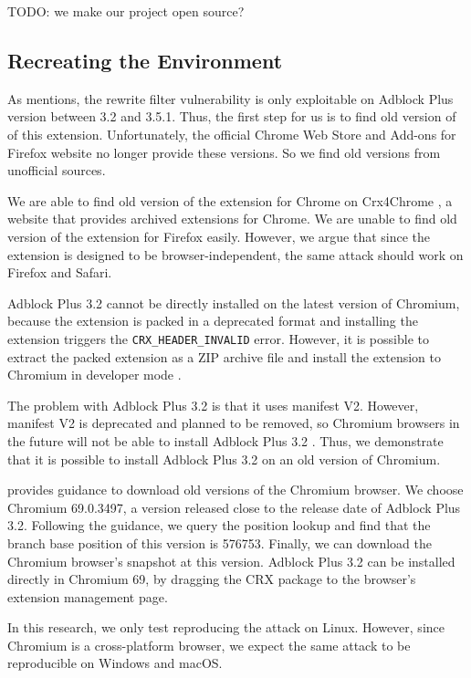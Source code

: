 \documentclass[conference]{IEEEtran}
\begin{document}
TODO: we make our project open source?

\subsection{Recreating the Environment}

As \cite{abp_code_injection} mentions, the rewrite filter vulnerability is only exploitable on Adblock Plus version between 3.2 and 3.5.1. Thus, the first step for us is to find old version of of this extension. Unfortunately, the official Chrome Web Store and Add-ons for Firefox website no longer provide these versions. So we find old versions from unofficial sources.

We are able to find old version of the extension for Chrome on Crx4Chrome \cite{cr4chrome_abp}, a website that provides archived extensions for Chrome. We are unable to find old version of the extension for Firefox easily. However, we argue that since the extension is designed to be browser-independent, the same attack should work on Firefox and Safari.

Adblock Plus 3.2 cannot be directly installed on the latest version of Chromium, because the extension is packed in a deprecated format and installing the extension triggers the \lstinline{CRX_HEADER_INVALID} error. However, it is possible to extract the packed extension as a ZIP archive file and install the extension to Chromium in developer mode \cite{stackoverflow_crx_header_invalid}.

The problem with Adblock Plus 3.2 is that it uses manifest V2. However, manifest V2 is deprecated and planned to be removed, so Chromium browsers in the future will not be able to install Adblock Plus 3.2 \cite{chrome_manifest_v2}. Thus, we demonstrate that it is possible to install Adblock Plus 3.2 on an old version of Chromium.

\cite{chromium_old_download} provides guidance to download old versions of the Chromium browser. We choose Chromium 69.0.3497, a version released close to the release date of Adblock Plus 3.2.
Following the guidance, we query the position lookup and find that the branch base position of this version is 576753. Finally, we can download the Chromium browser's snapshot at this version. Adblock Plus 3.2 can be installed directly in Chromium 69, by dragging the CRX package to the browser's extension management page.

In this research, we only test reproducing the attack on Linux. However, since Chromium is a cross-platform browser, we expect the same attack to be reproducible on Windows and macOS.
\end{document}
